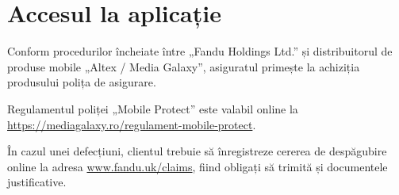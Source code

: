\section{Accesul la aplicație}

	Conform procedurilor încheiate între „Fandu Holdings Ltd.” \cite{media_galaxy} și distribuitorul de produse mobile „Altex / Media Galaxy”, asiguratul primește la achiziția produsului polița de asigurare.

	Regulamentul poliței „Mobile Protect” este valabil online la \url{https://mediagalaxy.ro/regulament-mobile-protect}\cite{media_galaxy}.

	În cazul unei defecțiuni, clientul trebuie să înregistreze cererea de despăgubire online la adresa \url{www.fandu.uk/claims}, fiind obligați să trimită și documentele justificative.
